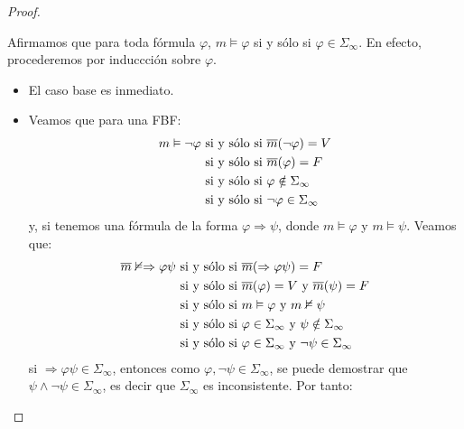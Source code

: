 \documentclass[12pt]{report}
\newcounter{it}
\theoremstyle{largebreak}
\begin{document}
\begin{proof}
\begin{itemize}
            Afirmamos que para toda fórmula $\varphi$, $m\vDash\varphi$ si y sólo si $\varphi\in\Sigma_{\infty}$. En efecto, procederemos por induccción sobre $\varphi$.
            \begin{itemize}
                \item El caso base es inmediato.
                \item Veamos que para una FBF:
                \begin{equation*}
                    \begin{split}
                        m\vDash\neg\varphi&\textup{ si y sólo si }\overline{m}(\neg\varphi)=V\\
                        &\textup{ si y sólo si }\overline{m}(\varphi)=F\\
                        &\textup{ si y sólo si }\varphi\notin\Sigma_{\infty}\\
                        &\textup{ si y sólo si }\neg\varphi\in\Sigma_{\infty}\\
                    \end{split}
                \end{equation*}
                y, si tenemos una fórmula de la forma $\varphi\Rightarrow\psi$, donde $m\vDash\varphi$ y $m\vDash\psi$. Veamos que:
                \begin{equation*}
                    \begin{split}
                        \overline{m}\nvDash\Rightarrow\varphi\psi&\textup{ si y sólo si }\overline{m}(\Rightarrow\varphi\psi)=F\\
                        &\textup{ si y sólo si }\overline{m}(\varphi)=V\textup{ y }\overline{m}(\psi)=F\\
                        &\textup{ si y sólo si }m\vDash\varphi\textup{ y }m\nvDash\psi\\
                        &\textup{ si y sólo si }\varphi\in\Sigma_{\infty}\textup{ y }\psi\notin\Sigma_{\infty}\\
                        &\textup{ si y sólo si }\varphi\in\Sigma_{\infty}\textup{ y }\neg\psi\in\Sigma_{\infty}\\
                    \end{split}
                \end{equation*}
                si $\Rightarrow\varphi\psi\in\Sigma_{\infty}$, entonces como $\varphi,\neg\psi\in\Sigma_\infty$, se puede demostrar que $\psi\land\neg\psi\in\Sigma_{\infty}$, es decir que $\Sigma_{\infty}$ es inconsistente. Por tanto:

\end{itemize}
\end{itemize}
\end{proof}
\end{document}
